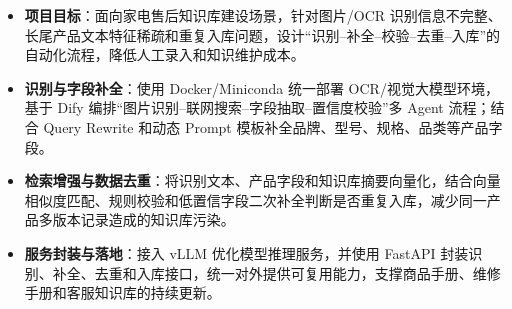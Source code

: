 \documentclass[10pt]{article}
\begin{document}
    \vspace{0.35em}
    \begin{itemize}
        \item \textbf{项目目标}：面向家电售后知识库建设场景，针对图片/OCR 识别信息不完整、长尾产品文本特征稀疏和重复入库问题，设计“识别--补全--校验--去重--入库”的自动化流程，降低人工录入和知识维护成本。
        \item \textbf{识别与字段补全}：使用 Docker/Miniconda 统一部署 OCR/视觉大模型环境，基于 Dify 编排“图片识别--联网搜索--字段抽取--置信度校验”多 Agent 流程；结合 Query Rewrite 和动态 Prompt 模板补全品牌、型号、规格、品类等产品字段。
        \item \textbf{检索增强与数据去重}：将识别文本、产品字段和知识库摘要向量化，结合向量相似度匹配、规则校验和低置信字段二次补全判断是否重复入库，减少同一产品多版本记录造成的知识库污染。
        \item \textbf{服务封装与落地}：接入 vLLM 优化模型推理服务，并使用 FastAPI 封装识别、补全、去重和入库接口，统一对外提供可复用能力，支撑商品手册、维修手册和客服知识库的持续更新。
    \end{itemize}

\end{document}
